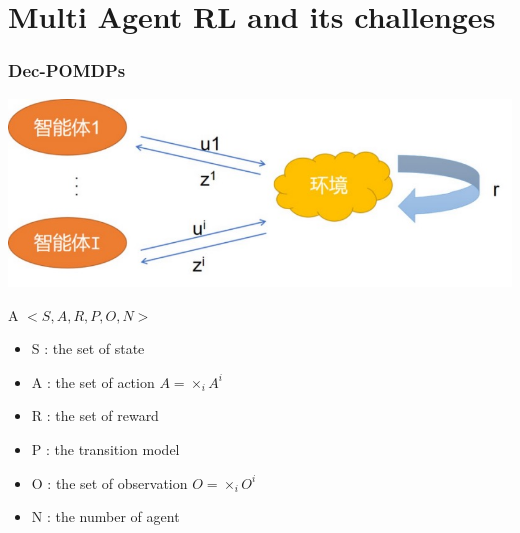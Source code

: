 \documentclass[notheorems, aspectratio=54]{beamer}
\begin{document}
\section{ Multi Agent RL and its challenges}
\begin{frame}
  \frametitle{Dec-POMDPs}
  \begin{minipage}{0.45\textwidth}
    \includegraphics[width=\textwidth]{dec_pomdp.png}
  \end{minipage}
  \hspace{0.05\linewidth} 
  \begin{minipage}{0.45\textwidth}
    \begin{center}
    A $<S, A, R, P, O, N>$
    \end{center}
   \begin{itemize}
     \item S : the set of state
     \item A : the set of action $A = \times_{i}A^{i}$
     \item R : the set of reward 
     \item P : the transition model
     \item O : the set of observation $O = \times_{i}O^{i}$
     \item N : the number of agent
   \end{itemize}
  
  \end{minipage}
  \end{frame}
\end{document}
